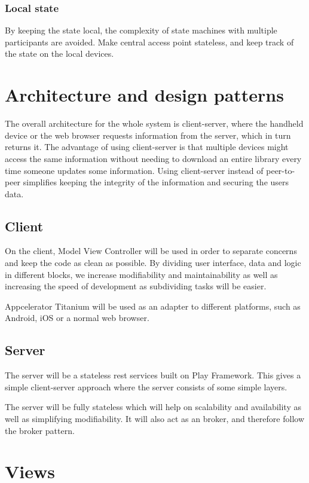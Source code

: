 \documentclass[11pt]{book}
\begin{document}
\subsubsection{Local state}
By keeping the state local, the complexity of state machines with multiple participants are avoided. Make central access point stateless, and keep track of the state on the local devices.

\section{Architecture and design patterns}

The overall architecture for the whole system is client-server, where the handheld device or the web browser requests information from the server, which in turn returns it. The advantage of using client-server is that multiple devices might access the same information without needing to download an entire library every time someone updates some information. Using client-server instead of peer-to-peer simplifies keeping the integrity of the information and securing the users data.

\subsection{Client}
On the client, Model View Controller will be used in order to separate concerns and keep the code as clean as possible. By dividing user interface, data and logic in different blocks, we increase modifiability and maintainability as well as increasing the speed of development as subdividing tasks will be easier.

Appcelerator Titanium will be used as an adapter to different platforms, such as Android, iOS or a normal web browser.

\subsection{Server}
The server will be a stateless \gls{rest} services built on Play Framework. This gives a simple client-server approach where the server consists of some simple layers.

The server will be fully stateless which will help on scalability and availability as well as simplifying modifiability. It will also act as an broker, and therefore follow the broker pattern.

\section{Views}
\end{document}
